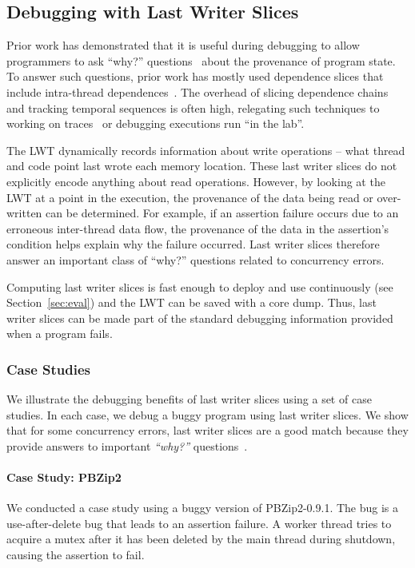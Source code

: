\documentclass[preprint,9pt]{sigplanconf}
\newcommand{\lwt}{LWT\xspace}
\begin{document}
\subsection{Debugging with Last Writer Slices}
\label{sec:debugging}
Prior work has demonstrated that it is useful during debugging to allow
programmers to ask ``why?'' questions~\cite{whylineicse,whylinechi} about the
provenance of program state.  To answer such questions, prior work has mostly
used dependence slices that include intra-thread
dependences~\cite{whylineicse,conseq,tipslicingsurvey}.  The overhead of
slicing dependence chains and tracking temporal sequences is often high,
relegating such techniques to working on traces~\cite{whylinechi} or debugging
executions run ``in the lab''.  

The \lwt dynamically records information about write operations -- what thread
and code point last wrote each memory location.   These last writer slices do
not explicitly encode anything about read operations.  However, by looking at
the \lwt at a point in the execution, the provenance of the data being read or
over-written can be determined.  For example, if an assertion failure occurs
due to an erroneous inter-thread data flow, the provenance of the data in the
assertion's condition helps explain why the failure occurred.  Last writer
slices therefore answer an important class of ``why?'' questions related to
concurrency errors.     

Computing last writer slices is fast enough to deploy and use continuously (see
Section~\ref{sec:eval}) and the \lwt can be saved with a core dump.  Thus, last
writer slices can be made part of the standard debugging information provided
when a program fails.  

\subsubsection{Case Studies}

We illustrate the debugging benefits of last writer slices using a set of case
studies.  In each case, we debug a buggy program using last writer slices.  We
show that for some concurrency errors, last writer slices are a good match
because they provide answers to important {\em ``why?''}
questions~\cite{whylineicse}.  

\paragraph{Case Study: PBZip2}
We conducted a case study using a buggy version of PBZip2-0.9.1.    The bug is
a use-after-delete bug that leads to an assertion failure.  A worker thread
tries to acquire a mutex after it has been deleted by the main thread during
shutdown, causing the assertion to fail.  
\end{document}
